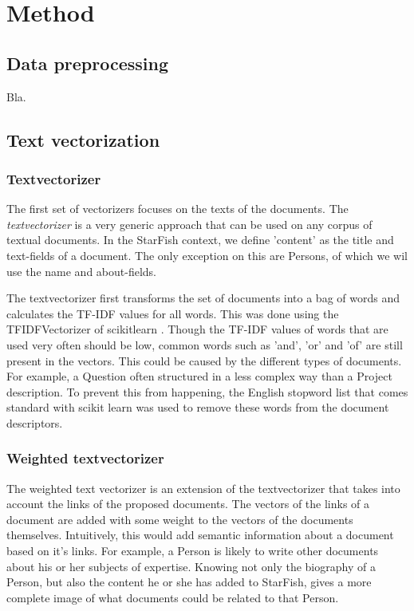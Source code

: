 \section{Method}

\subsection{Data preprocessing}
Bla.

\subsection{Text vectorization}
\subsubsection{Textvectorizer}

The first set of vectorizers focuses on the texts of the documents. The \emph{textvectorizer} is a very generic approach that can be used on any corpus of textual documents. In the StarFish context, we define 'content' as the title and text-fields of a document. The only exception on this are Persons, of which we wil use the name and about-fields. 

The textvectorizer first transforms the set of documents into a bag of words and calculates the TF-IDF values for all words. This was done using the TFIDFVectorizer of scikitlearn \citep{scikit-learn}.  Though the TF-IDF values of words that are used very often should be low, common words such as 'and', 'or' and 'of' are still present in the vectors. This could be caused by the different types of documents. For example, a Question often structured in a less complex way than a Project description. To prevent this from happening, the English stopword list that comes standard with scikit learn was used to remove these words from the document descriptors.

\subsubsection{Weighted textvectorizer}
The weighted text vectorizer is an extension of the textvectorizer that takes into account the links of the proposed documents. The vectors of the links of a document are added with some weight to the vectors of the documents themselves. Intuitively, this would add semantic information about a document based on it's links. For example, a Person is likely to write other documents about his or her subjects of expertise. Knowing not only the biography of a Person, but also the content he or she has added to StarFish, gives a more complete image of what documents could be related to that Person.

